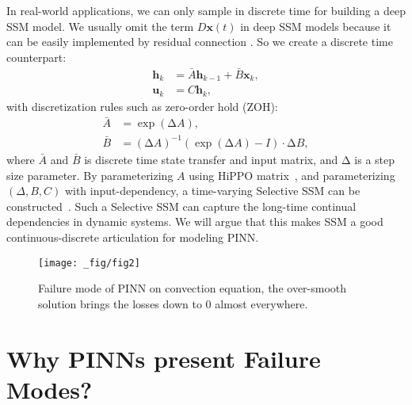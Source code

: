     In real-world applications, we can only sample in discrete time for building a deep SSM model. 
        We usually omit the term $D\mathbf x(t)$ in deep SSM models because it can be easily implemented by residual connection \cite{he2016deep}. So we create a discrete time counterpart:
\begin{align}
    \mathbf h_k &= \bar A \mathbf h_{k-1}+\bar B \mathbf x_k,
\\
    \mathbf u_k &= C \mathbf h_k,
\end{align}
with discretization rules such as zero-order hold (ZOH):
\begin{align}\label{equ:disc1}
    \bar A &= \exp{(\mathrm{\Delta}A)},\\
    \bar B &= (\mathrm{\Delta}A)^{-1}( \exp{(\mathrm{\Delta}A)}-I)\cdot \mathrm{\Delta}B,
    \label{equ:disc2}
\end{align}
where $\bar A$ and $\bar B$ is discrete time state transfer and input matrix, and $\mathrm{\Delta}$ is a step size parameter. By parameterizing $A$ using HiPPO  matrix~\cite{gu2020hippo}, and parameterizing $(\Delta,B,C)$ with input-dependency, a time-varying Selective SSM can be constructed~\cite{gu2023mamba}. Such a Selective SSM can capture the long-time continual dependencies in dynamic systems. We will argue that this makes SSM a good continuous-discrete articulation for modeling PINN.
\begin{figure}[t!]
    \centering
    \texttt{[image: \_fig/fig2]}
    \vspace{-8mm}
    \caption{Failure mode of PINN on convection equation, the over-smooth solution brings the losses down to 0 almost everywhere.}
    \label{fig2}
    \vspace{-3mm}
\end{figure}

\section{Why PINNs present Failure Modes?}
\label{sec:fail}


